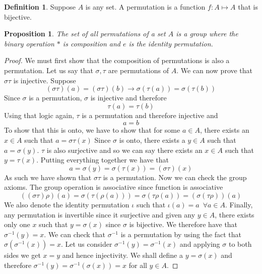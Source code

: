 \documentclass{article}
\newtheorem{proposition}[theorem]{Proposition}
\theoremstyle{definition}
\newtheorem{definition}[theorem]{Definition}
\begin{document}
\begin{definition}
    Suppose $A$ is any set. A permutation is a function $f:A\mapsto A$ that is bijective.
\end{definition}
\begin{proposition}
    The set of all permutations of a set $A$ is a group where the binary operation $*$ is composition and $e$ is the identity permutation.
\end{proposition}
\begin{proof}
    We must first show that the composition of permutations is also a permutation. Let us say that $\sigma,\tau$ are permutations of $A$. We can now prove that $\sigma \tau$ is injective. Suppose
    \begin{equation*}
        (\sigma \tau)(a) = (\sigma\tau )(b) \rightarrow \sigma(\tau(a))=\sigma(\tau(b))
    \end{equation*}
    Since $\sigma$ is a permutation, $\sigma$ is injective and therefore 
    \begin{equation*}
        \tau(a)=\tau(b)
    \end{equation*}
    Using that logic again, $\tau$ is a permutation and therefore injective and 
    \begin{equation*}
        a=b
    \end{equation*}
    To show that this is onto, we have to show that for some $a\in A$, there exists an $x\in A$ such that $a=\sigma\tau (x)$ Since $\sigma$ is onto, there exists a $y\in A$ such that $a=\sigma(y)$. $\tau$ is also surjective and so we can say there exists an $x\in A$ such that $y=\tau(x)$. Putting everything together we have that 
    \begin{equation*}
        a=\sigma(y)=\sigma(\tau(x))=(\sigma\tau)(x)
    \end{equation*}
    As such we have shown that $\sigma \tau$ is a permutation. Now we can check the group axioms. The group operation is associative since function is associative
    \begin{equation*}
        ((\sigma \tau)\rho)(a) =\sigma(\tau(\rho(a)))=\sigma(\tau\rho(a))=(\sigma(\tau \rho))(a) 
    \end{equation*}
    We also denote the identity permutation $\iota $ such that $\iota(a)=a \,\,\, \forall a\in A$. Finally, any permutation is invertible since it surjective and given any $y\in A$, there exists only one $x$ such that $y=\sigma(x)$ since $\sigma$ is bijective. We therefore have that $\sigma^{-1}(y)=x$. We can check that $\sigma^{-1}$ is a permutation by using the fact that $\sigma(\sigma^{-1}(x))=x$. Let us consider $\sigma^{-1}(y)=\sigma^{-1}(x)$ and applying $\sigma$ to both sides we get $x=y$ and hence injectivity. We shall define a $y=\sigma(x)$ and therefore $\sigma^{-1}(y)=\sigma^{-1}(\sigma(x))=x$ for all $y\in A$.
\end{proof}
\end{document}

